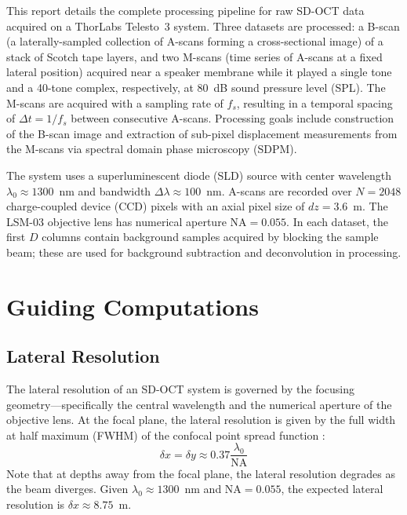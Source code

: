 \documentclass[10pt]{article}
\begin{document}
This report details the complete processing pipeline for raw SD-OCT data acquired on a ThorLabs Telesto~3 system. Three datasets are processed: a B-scan (a laterally-sampled collection of A-scans forming a cross-sectional image) of a stack of Scotch tape layers, and two M-scans (time series of A-scans at a fixed lateral position) acquired near a speaker membrane while it played a single tone and a 40-tone complex, respectively, at 80~dB sound pressure level (SPL). The M-scans are acquired with a sampling rate of $f_{s}$, resulting in a temporal spacing of $\Delta t=1/f_{s}$ between consecutive A-scans. Processing goals include construction of the B-scan image and extraction of sub-pixel displacement measurements from the M-scans via spectral domain phase microscopy (SDPM).

The system uses a superluminescent diode (SLD) source with center wavelength $\lambda_0 \approx 1300$~nm and bandwidth $\Delta\lambda \approx 100$~nm. A-scans are recorded over $N = 2048$ charge-coupled device (CCD) pixels with an axial pixel size of $dz = 3.6$~\textmu m. The LSM-03 objective lens has numerical aperture $\mathrm{NA} = 0.055$. In each dataset, the first $D$ columns contain background samples acquired by blocking the sample beam; these are used for background subtraction and deconvolution in processing.

\section{Guiding Computations}

\subsection{Lateral Resolution}
The lateral resolution of an SD-OCT system is governed by the focusing geometry---specifically the central wavelength and the numerical aperture of the objective lens. At the focal plane, the lateral resolution is given by the full width at half maximum (FWHM) of the confocal point spread function \cite{izattTheoryOpticalCoherence2015, brianlfrostthesis}:
\begin{equation}
  \delta x = \delta y \approx 0.37 \frac{\lambda_0}{\mathrm{NA}}
  \label{eq:lateral_resolution}
\end{equation}
Note that at depths away from the focal plane, the lateral resolution degrades as the beam diverges. Given $\lambda_0 \approx 1300$~nm and $\mathrm{NA} = 0.055$, the expected lateral resolution is $\delta x \approx 8.75$~\textmu m.
\end{document}
